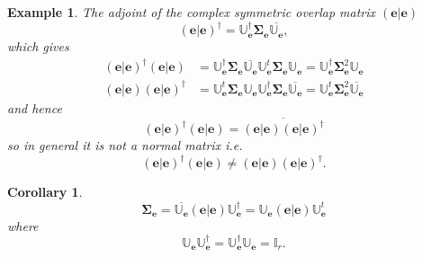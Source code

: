\documentclass[aps,preprint]{revtex4}%
\newtheorem{corollary}[theorem]{Corollary}
\newtheorem{example}[theorem]{Example}
\begin{document}
\begin{example}
The adjoint of the complex symmetric overlap matrix $\left(  \left.
\mathbf{e}\right\vert \mathbf{e}\right)  $
\begin{equation}
\left(  \left.  \mathbf{e}\right\vert \mathbf{e}\right)  ^{\dagger}%
=\mathbb{U}_{\mathbf{e}}^{\dagger}\mathbf{\Sigma}_{\mathbf{e}}\overline
{\mathbb{U}_{\mathbf{e}}},
\end{equation}
which gives
\begin{align}
\left(  \left.  \mathbf{e}\right\vert \mathbf{e}\right)  ^{\dagger}\left(
\left.  \mathbf{e}\right\vert \mathbf{e}\right)   &  =\mathbb{U}_{\mathbf{e}%
}^{\dagger}\mathbf{\Sigma}_{\mathbf{e}}\overline{\mathbb{U}_{\mathbf{e}}%
}\mathbb{U}_{\mathbf{e}}^{t}\mathbf{\Sigma}_{\mathbf{e}}\mathbb{U}%
_{\mathbf{e}}=\mathbb{U}_{\mathbf{e}}^{\dagger}\mathbf{\Sigma}_{\mathbf{e}%
}^{2}\mathbb{U}_{\mathbf{e}}\\
\left(  \left.  \mathbf{e}\right\vert \mathbf{e}\right)  \left(  \left.
\mathbf{e}\right\vert \mathbf{e}\right)  ^{\dagger}  &  =\mathbb{U}%
_{\mathbf{e}}^{t}\mathbf{\Sigma}_{\mathbf{e}}\mathbb{U}_{\mathbf{e}}%
\mathbb{U}_{\mathbf{e}}^{\dagger}\mathbf{\Sigma}_{\mathbf{e}}\overline
{\mathbb{U}_{\mathbf{e}}}=\mathbb{U}_{\mathbf{e}}^{t}\mathbf{\Sigma
}_{\mathbf{e}}^{2}\overline{\mathbb{U}_{\mathbf{e}}}%
\end{align}
and hence
\begin{equation}
\left(  \left.  \mathbf{e}\right\vert \mathbf{e}\right)  ^{\dagger}\left(
\left.  \mathbf{e}\right\vert \mathbf{e}\right)  =\overline{\left(  \left.
\mathbf{e}\right\vert \mathbf{e}\right)  \left(  \left.  \mathbf{e}\right\vert
\mathbf{e}\right)  ^{\dagger}}%
\end{equation}
so in general it is not a normal matrix i.e.%
\begin{equation}
\left(  \left.  \mathbf{e}\right\vert \mathbf{e}\right)  ^{\dagger}\left(
\left.  \mathbf{e}\right\vert \mathbf{e}\right)  \neq\left(  \left.
\mathbf{e}\right\vert \mathbf{e}\right)  \left(  \left.  \mathbf{e}\right\vert
\mathbf{e}\right)  ^{\dagger}.
\end{equation}

\end{example}

\begin{corollary}%
\begin{equation}
\mathbf{\Sigma}_{\mathbf{e}}=\overline{\mathbb{U}_{\mathbf{e}}}\left(  \left.
\mathbf{e}\right\vert \mathbf{e}\right)  \mathbb{U}_{\mathbf{e}}^{\dagger
}=\mathbb{U}_{\mathbf{e}}\left(  \left.  \mathbf{e}\right\vert \mathbf{e}%
\right)  \mathbb{U}_{\mathbf{e}}^{t}%
\end{equation}
where%
\begin{equation}
\mathbb{U}_{\mathbf{e}}\mathbb{U}_{\mathbf{e}}^{\dagger}=\mathbb{U}%
_{\mathbf{e}}^{\dagger}\mathbb{U}_{\mathbf{e}}=\mathbb{I}_{r}.
\end{equation}

\end{corollary}
\end{document}
